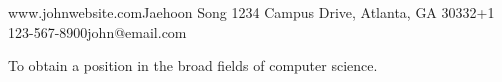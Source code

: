 %
%




\begin{resume-header}
  {www.johnwebsite.com}{Jaehoon Song}
  {1234 Campus Drive, Atlanta, GA 30332}{+1 123-567-8900}{john@email.com}
\end{resume-header}



\begin{resume-objective}
To obtain a position in the broad fields of computer science.
\end{resume-objective}










